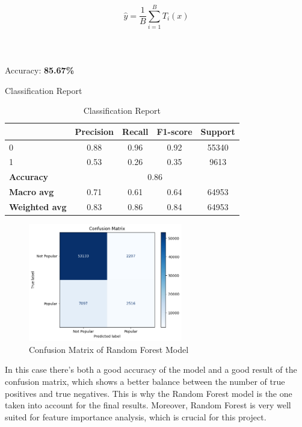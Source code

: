 \[
\hat{y} = \frac{1}{B} \sum_{i=1}^{B} T_i(x)
\]
\\
\\
\\
Accuracy: \textbf{85.67\%}

\newpage
Classification Report
\begin{table}[h]
    \centering
    \begin{tabular}{lcccc}
        \toprule
        & \textbf{Precision} & \textbf{Recall} & \textbf{F1-score} & \textbf{Support} \\
        \midrule
        0 & 0.88 & 0.96 & 0.92 & 55340 \\
        1 & 0.53 & 0.26 & 0.35 & 9613 \\
        \midrule
        \textbf{Accuracy} & \multicolumn{4}{c}{0.86} \\
        \textbf{Macro avg} & 0.71 & 0.61 & 0.64 & 64953 \\
        \textbf{Weighted avg} & 0.83 & 0.86 & 0.84 & 64953 \\
        \bottomrule
    \end{tabular}
    \caption{Classification Report}
    \label{tab:classification_report}
\end{table}

\begin{figure}[h] 
    \centering 
    \includegraphics[width=0.6\textwidth]{media/random_forest_conf_matrix.png}
    \caption{Confusion Matrix of Random Forest Model}

\end{figure}

In this case there's both a good accuracy of the model and a good result of the confusion matrix, which shows a better balance between the number of true positives and true negatives. This is why the Random Forest model is the one taken into account for the final results. Moreover, Random Forest is very well suited for feature importance analysis, which is crucial for this project.

